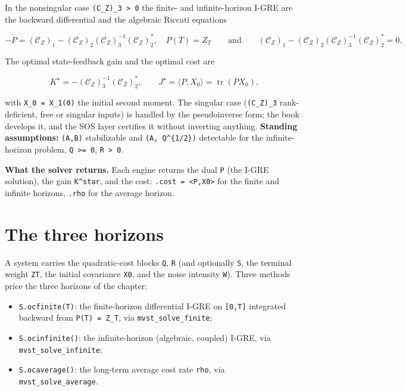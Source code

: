 \documentclass[11pt,oneside]{report}
\newcommand{\code}[1]{\texttt{#1}}
\providecommand{\tightlist}{\setlength{\itemsep}{0pt}\setlength{\parskip}{0pt}}
\begin{document}
In the nonsingular case \code{(C\_Z)\_3 \textgreater{} 0} the finite- and
infinite-horizon I-GRE are the backward differential and the algebraic Riccati
equations

\[
-\dot P = (\mathcal{C}_Z)_1 - (\mathcal{C}_Z)_2 (\mathcal{C}_Z)_3^{-1} (\mathcal{C}_Z)_2^{*},
\quad P(T) = Z_T
\qquad\text{and}\qquad
(\mathcal{C}_Z)_1 - (\mathcal{C}_Z)_2 (\mathcal{C}_Z)_3^{-1} (\mathcal{C}_Z)_2^{*} = 0 .
\]

The optimal state-feedback gain and the optimal cost are

\[
K^{\star} = -(\mathcal{C}_Z)_3^{-1} (\mathcal{C}_Z)_2^{*} ,
\qquad
J^{\star} = \langle P, X_0\rangle = \operatorname{tr}(P X_0) ,
\]

with \code{X\_0 = X\_1(0)} the initial second moment. The singular case
(\code{(C\_Z)\_3} rank-deficient, free or singular inputs) is handled by the
pseudoinverse form; the book develops it, and the SOS layer certifies it
without inverting anything. \textbf{Standing assumptions:} \code{(A,B)} stabilizable and
\code{(A, Q\^{}\{1/2\})} detectable for the infinite-horizon problem, \code{Q \textgreater{}= 0}, \code{R \textgreater{} 0}.

\textbf{What the solver returns.} Each engine returns the dual \code{P} (the I-GRE
solution), the gain \code{K\^{}star}, and the cost: \code{.cost = \textless{}P,X0\textgreater{}} for the finite and
infinite horizons, \code{.rho} for the average horizon.

\hypertarget{the-three-horizons}{%
\section{The three horizons}\label{the-three-horizons}}

A system carries the quadratic-cost blocks \code{Q}, \code{R} (and optionally \code{S}, the
terminal weight \code{ZT}, the initial covariance \code{X0}, and the noise intensity \code{W}).
Three methods price the three horizons of the chapter:

\begin{itemize}
\tightlist
\item
  \code{S.ocfinite(T)}: the finite-horizon differential I-GRE on \code{[0,T]} integrated
  backward from \code{P(T) = Z\_T}, via \code{mvst\_solve\_finite};
\item
  \code{S.ocinfinite()}: the infinite-horizon (algebraic, coupled) I-GRE, via
  \code{mvst\_solve\_infinite};
\item
  \code{S.ocaverage()}: the long-term average cost rate \code{rho}, via
  \code{mvst\_solve\_average}.
\end{itemize}
\end{document}
